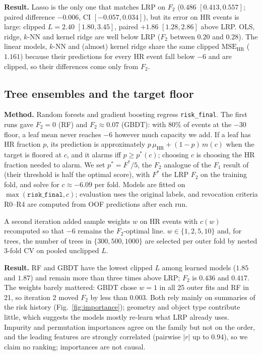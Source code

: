 \documentclass[clean,twocolumn]{bam-proposal}
\newcommand{\HR}{\mathrm{HR}}
\newcommand{\MSEHR}{\mathrm{MSE}_{\mathrm{HR}}}
\begin{document}
\textbf{Result.} Lasso is the only one that matches LRP on $F_2$ ($0.486$ $[0.413,0.557]$; paired difference $-0.006$, CI $[-0.057,0.034]$), but its error on HR events is large: clipped $L=2.40$ $[1.80,3.45]$, paired $+1.86$ $[1.28,2.86]$ above LRP. OLS, ridge, $k$-NN and kernel ridge are well below LRP ($F_2$ between $0.20$ and $0.28$). The linear models, $k$-NN and (almost) kernel ridge share the same clipped $\MSEHR$ ($1.161$) because their predictions for every HR event fall below $-6$ and are clipped, so their differences come only from $F_2$.

\subsection{Tree ensembles and the target floor}\label{sec:trees}
\textbf{Method.} Random forests \citep{breiman2001random} and gradient boosting \citep{friedman2001greedy} regress \texttt{risk\_final}. The first runs gave $F_2=0$ (RF) and $F_2\approx0.07$ (GBDT): with 80\% of events at the $-30$ floor, a leaf mean never reaches $-6$ however much capacity we add. If a leaf has HR fraction $p$, its prediction is approximately $p\,\mu_{\HR}+(1-p)\,m(c)$ when the target is floored at $c$, and it alarms iff $p\ge p^*(c)$; choosing $c$ is choosing the HR fraction needed to alarm. We set $p^*=F^*/5$, the $F_2$ analogue of the $F_1$ result of \citet{lipton2014optimal} (their threshold is half the optimal score), with $F^*$ the LRP $F_2$ on the training fold, and solve for $c\approx-6.09$ per fold. Models are fitted on $\max(\texttt{risk\_final},c)$; evaluation uses the original labels, and revocation criteria R0--R4 are computed from OOF predictions after each run.

A second iteration added sample weights $w$ on HR events with $c(w)$ recomputed so that $-6$ remains the $F_2$-optimal line. $w\in\{1,2,5,10\}$ and, for trees, the number of trees in $\{300,500,1000\}$ are selected per outer fold by nested 3-fold CV on pooled unclipped $L$.

\textbf{Result.} RF and GBDT have the lowest clipped $L$ among learned models ($1.85$ and $1.87$) and remain more than three times above LRP; $F_2$ is $0.436$ and $0.417$. The weights barely mattered: GBDT chose $w=1$ in all 25 outer fits and RF in 21, so iteration 2 moved $F_2$ by less than $0.003$. Both rely mainly on summaries of the risk history (Fig.~\ref{fig:importance}); geometry and object type contribute little, which suggests the models mostly re-learn what LRP already uses. Impurity and permutation importances agree on the family but not on the order, and the leading features are strongly correlated (pairwise $|r|$ up to 0.94), so we claim no ranking; importances are not causal.
\end{document}
